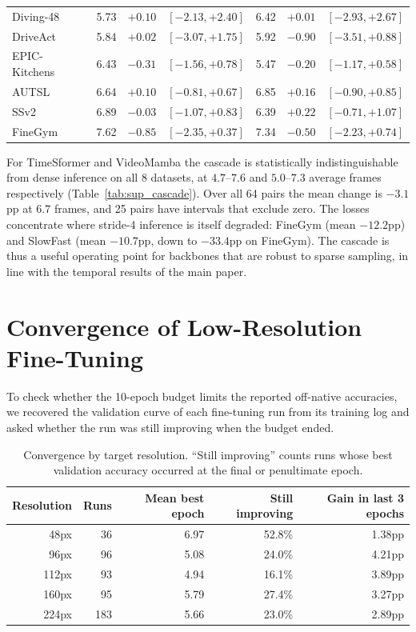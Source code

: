 \documentclass[a4paper, 10pt, conference, onecolumn]{ieeeconf}
\newcommand{\tabtight}{\setlength{\tabcolsep}{3.5pt}\renewcommand{\arraystretch}{1.12}}
\begin{document}
\begin{table}[!htbp]
\begin{tabular}{l r r l r r l}
Diving-48     & 5.73 & $+0.10$ & $[-2.13,+2.40]$ & 6.42 & $+0.01$ & $[-2.93,+2.67]$ \\
DriveAct      & 5.84 & $+0.02$ & $[-3.07,+1.75]$ & 5.92 & $-0.90$ & $[-3.51,+0.88]$ \\
EPIC-Kitchens & 6.43 & $-0.31$ & $[-1.56,+0.78]$ & 5.47 & $-0.20$ & $[-1.17,+0.58]$ \\
AUTSL         & 6.64 & $+0.10$ & $[-0.81,+0.67]$ & 6.85 & $+0.16$ & $[-0.90,+0.85]$ \\
SSv2          & 6.89 & $-0.03$ & $[-1.07,+0.83]$ & 6.39 & $+0.22$ & $[-0.71,+1.07]$ \\
FineGym       & 7.62 & $-0.85$ & $[-2.35,+0.37]$ & 7.34 & $-0.50$ & $[-2.23,+0.74]$ \\
\bottomrule
\end{tabular}
\end{table}

For TimeSformer and VideoMamba the cascade is statistically indistinguishable
from dense inference on all 8 datasets, at $4.7$--$7.6$ and $5.0$--$7.3$ average
frames respectively (Table~\ref{tab:sup_cascade}). Over all 64 pairs the mean
change is $-3.1$pp at $6.7$ frames, and 25 pairs have intervals that exclude
zero. The losses concentrate where stride-4 inference is itself degraded:
FineGym (mean $-12.2$pp) and SlowFast (mean $-10.7$pp, down to $-33.4$pp on FineGym). The
cascade is thus a useful operating point for backbones that are robust to
sparse sampling, in line with the temporal results of the main paper.

\section{Convergence of Low-Resolution Fine-Tuning}
\label{sec:sup_convergence}

To check whether the 10-epoch budget limits the reported off-native accuracies,
we recovered the validation curve of each fine-tuning run from its training log
and asked whether the run was still improving when the budget ended.

\begin{table}[!htbp]
\centering
\caption{Convergence by target resolution. ``Still improving'' counts runs whose
best validation accuracy occurred at the final or penultimate epoch.}
\label{tab:sup_convergence}
\scriptsize\tabtight
\begin{tabular}{r r r r r}
\toprule
Resolution & Runs & Mean best epoch & Still improving & Gain in last 3 epochs \\
\midrule
48px  &  36 & 6.97 & 52.8\% & 1.38pp \\
96px  &  96 & 5.08 & 24.0\% & 4.21pp \\
112px &  93 & 4.94 & 16.1\% & 3.89pp \\
160px &  95 & 5.79 & 27.4\% & 3.27pp \\
224px & 183 & 5.66 & 23.0\% & 2.89pp \\
\bottomrule
\end{tabular}
\end{table}
\end{document}
